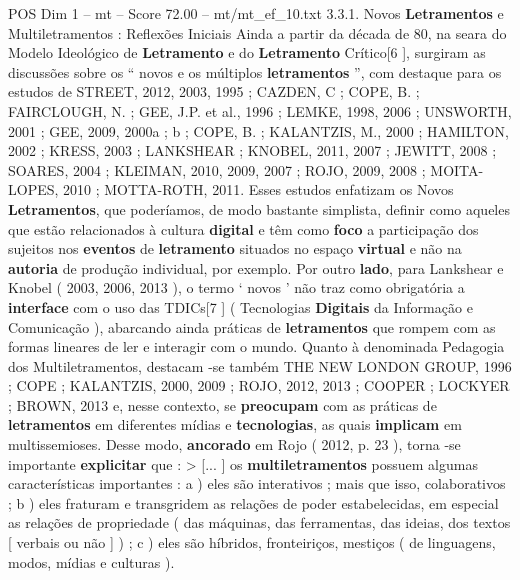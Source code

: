 \begin{textsample}{POS Dim 1 – mt – Score 72.00 – mt/mt\_ef\_10.txt}  \label{ex:f1_pos_073}
3.3.1.
Novos \textbf{Letramentos} e Multiletramentos : Reflexões Iniciais Ainda a partir da década de 80, na seara do Modelo Ideológico de \textbf{Letramento} e do \textbf{Letramento} Crítico[6 ], surgiram as discussões sobre os “ novos e os múltiplos \textbf{letramentos} ”, com destaque para os estudos de STREET, 2012, 2003, 1995 ; CAZDEN, C ; COPE, B. ; FAIRCLOUGH, N. ; GEE, J.P. et al., 1996 ; LEMKE, 1998, 2006 ; UNSWORTH, 2001 ; GEE, 2009, 2000a ; b ; COPE, B. ; KALANTZIS, M., 2000 ; HAMILTON, 2002 ; KRESS, 2003 ; LANKSHEAR ; KNOBEL, 2011, 2007 ; JEWITT, 2008 ; SOARES, 2004 ; KLEIMAN, 2010, 2009, 2007 ; ROJO, 2009, 2008 ; MOITA-LOPES, 2010 ; MOTTA-ROTH, 2011.
Esses estudos enfatizam os Novos \textbf{Letramentos}, que poderíamos, de modo bastante simplista, definir como aqueles que estão relacionados à cultura \textbf{digital} e têm como \textbf{foco} a participação dos sujeitos nos \textbf{eventos} de \textbf{letramento} situados no espaço \textbf{virtual} e não na \textbf{autoria} de produção individual, por exemplo.
Por outro \textbf{lado}, para Lankshear e Knobel ( 2003, 2006, 2013 ), o termo ‘ novos ’ não traz como obrigatória a \textbf{interface} com o uso das TDICs[7 ] ( Tecnologias \textbf{Digitais} da Informação e Comunicação ), abarcando ainda práticas de \textbf{letramentos} que rompem com as formas lineares de ler e interagir com o mundo.
Quanto à denominada Pedagogia dos Multiletramentos, destacam -se também THE NEW LONDON GROUP, 1996 ; COPE ; KALANTZIS, 2000, 2009 ; ROJO, 2012, 2013 ; COOPER ; LOCKYER ; BROWN, 2013 e, nesse contexto, se \textbf{preocupam} com as práticas de \textbf{letramentos} em diferentes mídias e \textbf{tecnologias}, as quais \textbf{implicam} em multissemioses.
Desse modo, \textbf{ancorado} em Rojo ( 2012, p. 23 ), torna -se importante \textbf{explicitar} que : > [... ] os \textbf{multiletramentos} possuem algumas características importantes : a ) eles são interativos ; mais que isso, colaborativos ; b ) eles fraturam e transgridem as relações de poder estabelecidas, em especial as relações de propriedade ( das máquinas, das ferramentas, das ideias, dos textos [ verbais ou não ] ) ; c ) eles são híbridos, fronteiriços, mestiços ( de linguagens, modos, mídias e culturas ).

\end{textsample}
